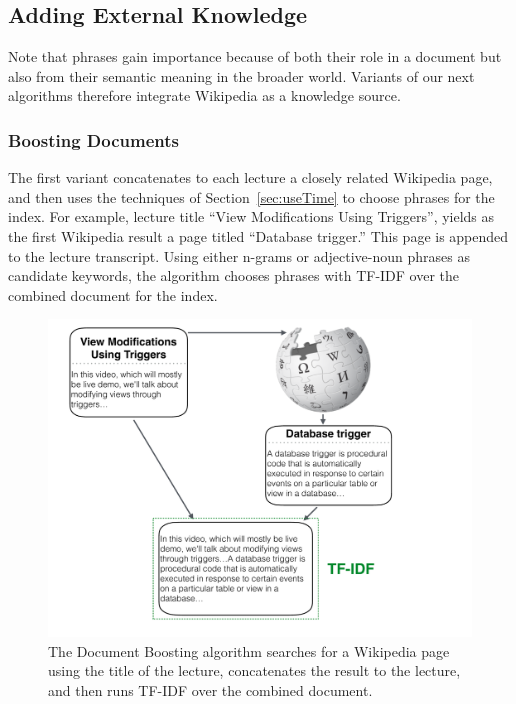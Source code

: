 \subsection{Adding External Knowledge}
\label{sec:wiki}


Note that phrases gain importance because of both their role in a
document but also from their semantic meaning in the broader world.
Variants of our next algorithms therefore integrate Wikipedia as a
knowledge source.

\subsubsection{Boosting Documents}

The first variant concatenates to each lecture a closely related
Wikipedia page, and then uses the techniques of
Section~\ref{sec:useTime} to choose phrases for the index. For
example, lecture title ``View Modifications Using Triggers'', yields
as the first Wikipedia result a page titled ``Database trigger.''
This page is appended to the lecture transcript. Using either
n-grams or adjective-noun phrases as candidate keywords, the algorithm
chooses phrases with TF-IDF over the combined document for the index.

\begin{figure}
\caption{The Document Boosting algorithm searches for a Wikipedia page using the title of the lecture, concatenates the result to the lecture, and then runs TF-IDF over the combined document.}
\includegraphics[width=\textwidth]{document_boosting.pdf}
\end{figure}

